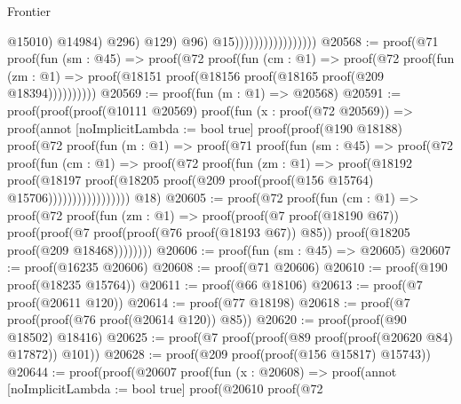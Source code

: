 \begin{lexlean}{Frontier}
\begin{coremodule}
                                                                        @15010)
                                                                      @14984)
                                                                    @296)
                                                                  @129)
                                                                @96)
                                                              @15)))))))))))))))))
@20568 := proof(@71
      proof(fun (sm : @45) =>
        proof(@72
            proof(fun (cm : @1) =>
              proof(@72
                  proof(fun (zm : @1) =>
                    proof(@18151 proof(@18156 proof(@18165 proof(@209 @18394))))))))))
@20569 := proof(fun (m : @1) => @20568)
@20591 := proof(proof(proof(@10111 @20569)
        proof(fun (x : proof(@72 @20569)) =>
          proof(annot [noImplicitLambda := bool true]
            proof(proof(@190 @18188)
                proof(@72
                    proof(fun (m : @1) =>
                      proof(@71
                          proof(fun (sm : @45) =>
                            proof(@72
                                proof(fun (cm : @1) =>
                                  proof(@72
                                      proof(fun (zm : @1) =>
                                        proof(@18192
                                            proof(@18197
                                                proof(@18205
                                                    proof(@209
                                                        proof(proof(@156 @15764)
                                                            @15706)))))))))))))))))
      @18)
@20605 := proof(@72
      proof(fun (cm : @1) =>
        proof(@72
            proof(fun (zm : @1) =>
              proof(proof(@7 proof(@18190 @67))
                  proof(proof(@7 proof(proof(@76 proof(@18193 @67)) @85))
                      proof(@18205 proof(@209 @18468))))))))
@20606 := proof(fun (sm : @45) => @20605)
@20607 := proof(@16235 @20606)
@20608 := proof(@71 @20606)
@20610 := proof(@190 proof(@18235 @15764))
@20611 := proof(@66 @18106)
@20613 := proof(@7 proof(@20611 @120))
@20614 := proof(@77 @18198)
@20618 := proof(@7 proof(proof(@76 proof(@20614 @120)) @85))
@20620 := proof(proof(@90 @18502) @18416)
@20625 := proof(@7 proof(proof(@89 proof(proof(@20620 @84) @17872)) @101))
@20628 := proof(@209 proof(proof(@156 @15817) @15743))
@20644 := proof(proof(@20607
        proof(fun (x : @20608) =>
          proof(annot [noImplicitLambda := bool true]
            proof(@20610
                proof(@72

\end{coremodule}
\end{lexlean}
